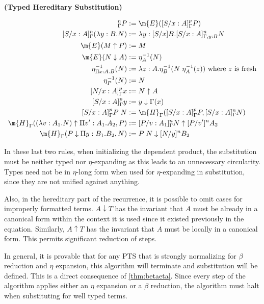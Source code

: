 \begin{definition}
\textbf{(Typed Hereditary Substitution)}

\begin{align}
[S / x : A]^n_{\Gamma } P &:= \m{E}([S / x : A]^p_{\Gamma } P)
\\
[S / x : A]^n_{\Gamma } (\lambda y : B . N) &:= \lambda y: [S / x ] B. [S / x : A]^n_{\Gamma, y : B} N
\\
\m{E}(M \uparrow P) &:= M
\\
\m{E}(N \downarrow A) &:= \eta^{-1}_A (N)
\\
\eta^{-1}_{\Pi x : A . B}(N) &:= \lambda z : A . \eta^{-1}_B(N \; \eta^{-1}_A(z))
 \text{ where $z$ is fresh}
\\
\eta^{-1}_{P}(N) &:= N
\\
[ N / x : A]^p_{\Gamma} x &:= N \uparrow A
\\
[S / x : A]^p_{\Gamma} y &:= y \downarrow \Gamma(x)
\\
[S / x : A]^p_{\Gamma } P\;N &:= 
\m{H}_{\Gamma} ( [S/x : A]^p_{\Gamma} P , [S/x : A]^n_{\Gamma} N) 
\\
\m{H}_{\Gamma} ((\lambda v : A_1 . N) \uparrow \Pi v' : A_1 . A_2 , P) 
&:= [P/v : A_1]^n_{\Gamma} N \uparrow [P/v']^n A_2
\\
\m{H}_{\Gamma}(P \downarrow \Pi y : B_1 . B_2 , N) &:= P\; N \downarrow [N/y]^nB_2
\end{align}

\label{def:tyhered}
\end{definition} 

In these last two rules, when initializing the dependent product, the substitution must be neither typed
nor $\eta$-expanding as this leads to an unnecessary circularity.  Types need not be in $\eta$-long form
when used for $\eta$-expanding in substitution, since they are not unified against anything.

Also, in the hereditary part of the recurrence, 
it is possible to omit cases for improperly formatted terms.  $A \downarrow T$ has the invariant that
$A$ must be already in a canonical form within the context it is used since it existed previously in the
equation.  Similarly, $A \uparrow T$ has the invariant that $A$ must be locally in a canonical form.
This permits significant reduction of steps.

In general, it is provable that for any PTS that is strongly normalizing for $\beta$ reduction and 
$\eta$ expansion, this algorithm will terminate and substitution will be defined.  
This is a direct consequence of \ref{thm:betaeta}.  
Since every step of the algorithm applies either an $\eta$ expansion or 
a $\beta$ reduction, the algorithm must halt when substituting for well typed terms.

